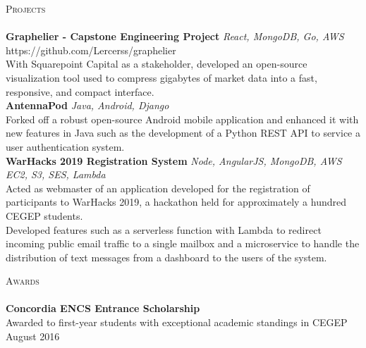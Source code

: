 \documentclass[a4paper]{article}
\newcommand{\lineunder} {
    \vspace*{-8pt} \\
    \hspace*{-18pt} \hrulefill \\
}
\newcommand{\header} [1] {
    {\hspace*{-18pt}\vspace*{6pt} \textsc{#1}}
    \vspace*{-6pt} \lineunder
}
\begin{document}
\header{Projects}
\vspace*{2mm}
{\textbf{Graphelier - Capstone Engineering Project}} {\sl React, MongoDB, Go, AWS} \hfill https://github.com/Lercerss/graphelier\\
\vspace*{1mm}
With Squarepoint Capital as a stakeholder, developed an open-source visualization tool used to compress gigabytes of market data into a fast, responsive, and compact interface.\\
\vspace*{2mm}
{\textbf{AntennaPod}} {\sl Java, Android, Django} \\
\vspace*{1mm}
Forked off a robust open-source Android mobile application and enhanced it with new features in Java such as the development of a Python REST API to service a user authentication system.\\
\vspace*{2mm}
{\textbf{WarHacks 2019 Registration System}} {\sl Node, AngularJS, MongoDB, AWS EC2, S3, SES, Lambda} \\
\vspace*{1mm}
Acted as webmaster of an application developed for the registration of participants to WarHacks 2019, a hackathon held for approximately a hundred CEGEP students.\\
\vspace*{1mm}
Developed features such as a serverless function with Lambda to redirect incoming public email traffic to a single mailbox and a microservice to handle the distribution of text messages from a dashboard to the users of the system.
\newline

\vspace*{2mm}

\header{Awards}
\textbf{Concordia ENCS Entrance Scholarship}\\
Awarded to first-year students with exceptional academic standings in CEGEP \hfill August 2016\\
\vspace*{2mm}

\ 
\end{document}

